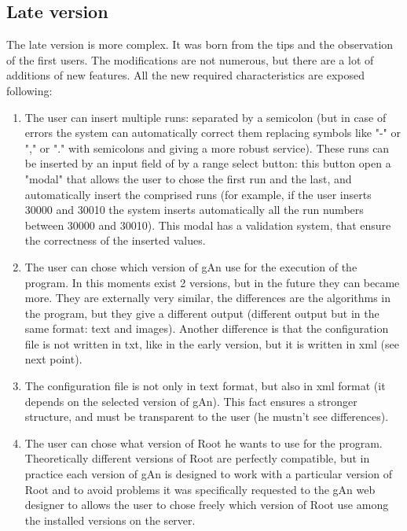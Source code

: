 \subsection{Late version}
The late version is more complex. It was born from the tips and the observation of the first users. The modifications are not numerous, but there are a lot of additions of new features. All the new required characteristics are exposed following:

\begin{enumerate}

\item The user can insert multiple runs: separated by a semicolon (but in case of errors the system can automatically correct them replacing symbols like "-" or "," or "." with semicolons and giving a more robust service). These runs can be inserted by an input field of by a range select button: this button open a "modal" that allows the user to chose the first run and the last, and automatically insert the comprised runs (for example, if the user inserts 30000 and 30010 the system inserts automatically all the run numbers between 30000 and 30010). This modal has a validation system, that ensure the correctness of the inserted values. 

\item The user can chose which version of gAn use for the execution of the program. In this moments exist 2 versions, but in the future they can became more. They are externally very similar, the differences are the algorithms in the program, but they give a different output (different output but in the same format: text and images). Another difference is that the configuration file is not written in txt, like in the early version, but it is written in xml (see next point). 

\item The configuration file is not only in text format, but also in xml format (it depends on the selected version of gAn). This fact ensures a stronger structure, and must be transparent to the user (he mustn't see differences).

\item The user can chose what version of Root he wants to use for the program. Theoretically different versions of Root are perfectly compatible, but in practice each version of gAn is designed to work with a particular version of Root and to avoid problems it was specifically requested to the gAn web designer to allows the user to chose freely which version of Root use among the installed versions on the server.  


\end{enumerate}
